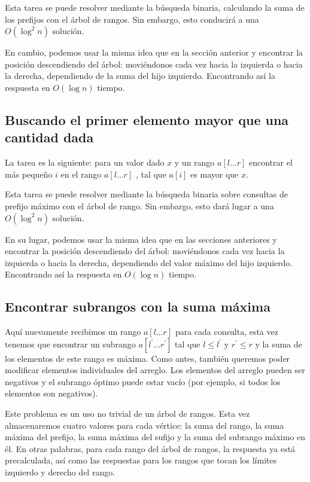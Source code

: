 Esta tarea se puede resolver mediante la búsqueda binaria, calculando la suma de los prefijos con el 
árbol de rangos. Sin embargo, esto conducirá a una $O(\log^2n)$ solución.

En cambio, podemos usar la misma idea que en la sección anterior y encontrar la posición descendiendo del árbol: moviéndonos cada vez hacia la izquierda o hacia la derecha, dependiendo de la suma del hijo izquierdo. Encontrando así la respuesta en $O(\log n)$ tiempo.

\subsection{Buscando el primer elemento mayor que una cantidad dada}

La tarea es la siguiente: para un valor dado $x$ y un rango $a[l \dots r]$ encontrar el más pequeño $i$ en el rango $a[l \dots r]$ , tal que $a[i]$ es mayor que $x$.

Esta tarea se puede resolver mediante la búsqueda binaria sobre consultas de prefijo máximo con el árbol de rango. Sin embargo, esto dará lugar a una $O(\log^2n)$ solución.

En su lugar, podemos usar la misma idea que en las secciones anteriores y encontrar la posición descendiendo del árbol: moviéndonos cada vez hacia la izquierda o hacia la derecha, dependiendo del valor máximo del hijo izquierdo. Encontrando así la respuesta en $O(\log n)$ tiempo.

\subsection{Encontrar subrangos con la suma máxima}

Aquí nuevamente recibimos un rango $a[l \dots r]$ para cada consulta, esta vez tenemos que encontrar un 
subrango $a[l^\prime \dots r^\prime]$ tal que $l \le l^\prime$ y $r^\prime \le r$ y la suma de los 
elementos de este rango es máxima. Como antes, también queremos poder modificar elementos individuales 
del arreglo. Los elementos del arreglo pueden ser negativos y el subrango óptimo puede estar vacío 
(por ejemplo, si todos los elementos son negativos).

Este problema es un uso no trivial de un árbol de rangos. Esta vez almacenaremos cuatro valores para cada vértice: la suma del rango, la suma máxima del prefijo, la suma máxima del sufijo y la suma del subrango máximo en él. En otras palabras, para cada rango del árbol de rangos, la respuesta ya está precalculada, así como las respuestas para los rangos que tocan los límites izquierdo y derecho del rango.

